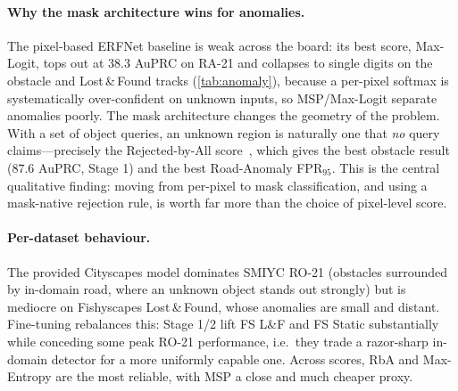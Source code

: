 \paragraph{Why the mask architecture wins for anomalies.}
The pixel-based ERFNet baseline is weak across the board: its best score,
Max-Logit, tops out at $38.3$ AuPRC on RA-21 and collapses to single digits on
the obstacle and Lost\,\&\,Found tracks (\cref{tab:anomaly}), because a
per-pixel softmax is systematically over-confident on unknown inputs, so
MSP/Max-Logit separate anomalies poorly. The mask architecture changes the
geometry of the problem. With a set of object queries, an unknown region is
naturally one that \emph{no} query claims---precisely the Rejected-by-All
score~\cite{rba}, which gives the best obstacle result ($87.6$ AuPRC, Stage 1)
and the best Road-Anomaly FPR$_{95}$. This is the central qualitative finding:
moving from per-pixel to mask classification, and using a mask-native rejection
rule, is worth far more than the choice of pixel-level score.

\paragraph{Per-dataset behaviour.}
The provided Cityscapes model dominates SMIYC RO-21 (obstacles surrounded by
in-domain road, where an unknown object stands out strongly) but is mediocre
on Fishyscapes Lost\,\&\,Found, whose anomalies are small and distant.
Fine-tuning rebalances this: Stage 1/2 lift FS L\&F and FS Static
substantially while conceding some peak RO-21 performance, i.e.\ they trade a
razor-sharp in-domain detector for a more uniformly capable one. Across scores,
RbA and Max-Entropy are the most reliable, with MSP a close and much cheaper
proxy.

